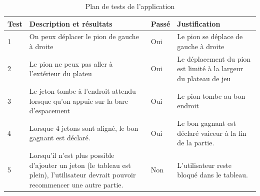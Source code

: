 \begin{table}[H]
    \centering
    \caption{Plan de tests de l'application}
    \begin{tabular}{p{0.25in}p{2.5in}p{0.5in}p{2.5in}}
        \hline
        \bfseries Test & \bfseries Description et résultats & \bfseries Passé & \bfseries Justification \\
        \hline\hline
        1 & On peux déplacer le pion de gauche à droite & Oui & Le pion se déplace de gauche à droite \\
        2 & Le pion ne peux pas aller à l'extérieur du plateu & Oui & Le déplacement du pion est limité à la largeur du plateau de jeu \\
        3 & Le jeton tombe à l'endroit attendu lorsque qu'on appuie sur la bare d'espacement & Oui & Le pion tombe au bon endroit \\
        4 & Lorsque 4 jetons sont aligné, le bon gagnant est déclaré. & Oui & Le bon gagnant est déclaré vaiceur à la fin de la partie.\\
        5 & Lorsqu'il n'est plus possible d'ajouter un jeton (le tableau est plein), l'utilisateur devrait pouvoir recommencer une autre partie.& Non & L'utilisateur reste bloqué dans le tableau.\\
        \hline
    \end{tabular}
\end{table}
